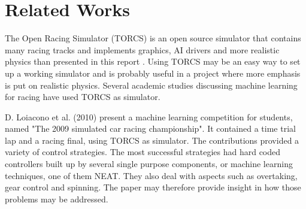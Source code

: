 





\section{Related Works}

The Open Racing Simulator (TORCS) is an open source simulator that contains many racing tracks and implements graphics, AI drivers and more realistic physics than presented in this report \cite{torcs}. Using TORCS may be an easy way to set up a working simulator and is probably useful in a project where more emphasis is put on realistic physics. Several academic studies discussing machine learning for racing have used TORCS as simulator. 

D. Loiacono et al. (2010) present a machine learning competition for students, named "The 2009 simulated car racing championship". It contained a time trial lap and a racing final, using TORCS as simulator. The contributions provided a variety of control strategies. The most successful strategies had hard coded controllers built up by several single purpose components, or machine learning techniques, one of them NEAT. They also deal with aspects such as overtaking, gear control and spinning. The paper may therefore provide insight in how those problems may be addressed.

